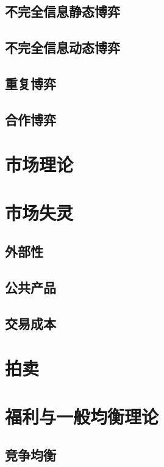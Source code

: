 \subsection{不完全信息静态博弈}

\subsection{不完全信息动态博弈}

\subsection{重复博弈}

\subsection{合作博弈}

\section{市场理论}

\section{市场失灵}
\subsection{外部性}

\subsection{公共产品}

\subsection{交易成本}


\section{拍卖}

\section{福利与一般均衡理论}
\subsection{竞争均衡}

